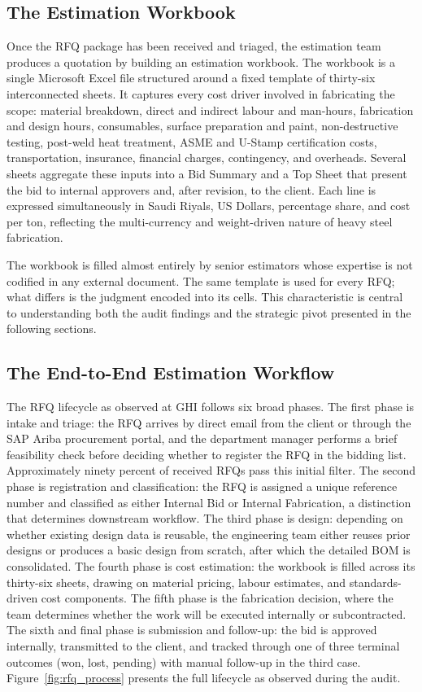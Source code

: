 \subsection*{The Estimation Workbook}
Once the RFQ package has been received and triaged, the estimation team produces a quotation by building an estimation workbook. The workbook is a single Microsoft Excel file structured around a fixed template of thirty-six interconnected sheets. It captures every cost driver involved in fabricating the scope: material breakdown, direct and indirect labour and man-hours, fabrication and design hours, consumables, surface preparation and paint, non-destructive testing, post-weld heat treatment, ASME and U-Stamp certification costs, transportation, insurance, financial charges, contingency, and overheads. Several sheets aggregate these inputs into a Bid Summary and a Top Sheet that present the bid to internal approvers and, after revision, to the client. Each line is expressed simultaneously in Saudi Riyals, US Dollars, percentage share, and cost per ton, reflecting the multi-currency and weight-driven nature of heavy steel fabrication.

The workbook is filled almost entirely by senior estimators whose expertise is not codified in any external document. The same template is used for every RFQ; what differs is the judgment encoded into its cells. This characteristic is central to understanding both the audit findings and the strategic pivot presented in the following sections.

\subsection*{The End-to-End Estimation Workflow}
The RFQ lifecycle as observed at GHI follows six broad phases. The first phase is intake and triage: the RFQ arrives by direct email from the client or through the SAP Ariba procurement portal, and the department manager performs a brief feasibility check before deciding whether to register the RFQ in the bidding list. Approximately ninety percent of received RFQs pass this initial filter. The second phase is registration and classification: the RFQ is assigned a unique reference number and classified as either Internal Bid or Internal Fabrication, a distinction that determines downstream workflow. The third phase is design: depending on whether existing design data is reusable, the engineering team either reuses prior designs or produces a basic design from scratch, after which the detailed BOM is consolidated. The fourth phase is cost estimation: the workbook is filled across its thirty-six sheets, drawing on material pricing, labour estimates, and standards-driven cost components. The fifth phase is the fabrication decision, where the team determines whether the work will be executed internally or subcontracted. The sixth and final phase is submission and follow-up: the bid is approved internally, transmitted to the client, and tracked through one of three terminal outcomes (won, lost, pending) with manual follow-up in the third case. Figure~\ref{fig:rfq_process} presents the full lifecycle as observed during the audit.

